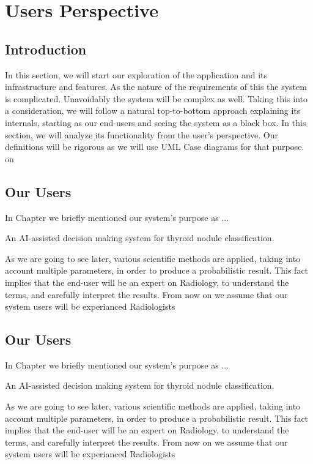 \chapter{Users Perspective}
\label{users_perspective}
	\section{Introduction}
		In this section, we will start our exploration of the application and its infrastructure and features. As the nature of the requirements of this
		the system is complicated. Unavoidably the system will be complex as well. Taking this into a consideration, we will follow a natural top-to-bottom
		approach explaining its internals, starting as our end-users and seeing the system as a black box. In this section, we will analyze its 
		functionality from the user's perspective. Our definitions will be rigorous as we will use UML Case diagrams for that purpose.
		on 
	\section{Our Users}
		In Chapter  we briefly mentioned our system's purpose as ...
		\begin{mydef}
			An AI-assisted decision making system for thyroid nodule classification.
		\end{mydef}
		As we are going to see later, various scientific methods are applied, taking into account 
		multiple parameters, in order to produce a probabilistic result. This fact implies that the
		end-user will be an expert on Radiology, to understand the terms, and carefully interpret the 
		results. From now on we assume that our system users will be experianced Radiologists
	\section{Our Users}
		In Chapter we briefly mentioned our system's purpose as ...
		\begin{mydef}
			An AI-assisted decision making system for thyroid nodule classification.
		\end{mydef}
		As we are going to see later, various scientific methods are applied, taking into account 
		multiple parameters, in order to produce a probabilistic result. This fact implies that the
		end-user will be an expert on Radiology, to understand the terms, and carefully interpret the 
		results. From now on we assume that our system users will be experianced Radiologists
		
	



